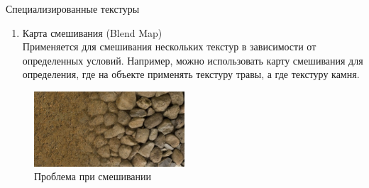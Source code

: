 \documentclass{beamer}
\begin{document}
	\begin{frame}{Специализированные текстуры}
		\begin{enumerate}		
			\item Карта смешивания (Blend Map)\\
			Применяется для смешивания нескольких текстур в зависимости от определенных условий. Например, можно использовать карту смешивания для определения, где на объекте применять текстуру травы, а где текстуру камня.
			\end{enumerate}

			\begin{figure} 
				\includegraphics[width=0.5\textwidth]{images/blend_1.jpg}
				\caption{Проблема при смешивании}
			\end{figure}


	\end{frame}
\end{document}
